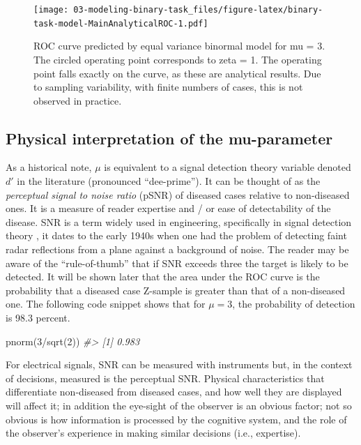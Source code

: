 \documentclass[
]{book}
\newenvironment{Shaded}{\begin{snugshade}}{\end{snugshade}}
\newcommand{\CommentTok}[1]{\textcolor[rgb]{0.56,0.35,0.01}{\textit{#1}}}
\newcommand{\DecValTok}[1]{\textcolor[rgb]{0.00,0.00,0.81}{#1}}
\newcommand{\FunctionTok}[1]{\textcolor[rgb]{0.00,0.00,0.00}{#1}}
\newcommand{\NormalTok}[1]{#1}
\newcommand{\SpecialCharTok}[1]{\textcolor[rgb]{0.00,0.00,0.00}{#1}}
\begin{document}
\begin{figure}
\centering
\texttt{[image: 03-modeling-binary-task\_files/figure-latex/binary-task-model-MainAnalyticalROC-1.pdf]}
\caption{\label{fig:binary-task-model-MainAnalyticalROC}ROC curve predicted by equal variance binormal model for mu = 3. The circled operating point corresponds to zeta = 1. The operating point falls exactly on the curve, as these are analytical results. Due to sampling variability, with finite numbers of cases, this is not observed in practice.}
\end{figure}

\hypertarget{binary-task-model-mu-parameter-intepretation}{%
\subsection{Physical interpretation of the mu-parameter}\label{binary-task-model-mu-parameter-intepretation}}

As a historical note, \(\mu\) is equivalent \citep{macmillan2004detection} to a signal detection theory variable denoted \(d'\) in the literature (pronounced ``dee-prime''). It can be thought of as the \emph{perceptual signal to noise ratio} (pSNR) of diseased cases relative to non-diseased ones. It is a measure of reader expertise and / or ease of detectability of the disease. SNR is a term widely used in engineering, specifically in signal detection theory \citep{green1966signal, egan1975book}, it dates to the early 1940s when one had the problem \citep[\citet{marcum1960statistical}]{marcum1947statistical} of detecting faint radar reflections from a plane against a background of noise. The reader may be aware of the ``rule-of-thumb'' that if SNR exceeds three the target is likely to be detected. It will be shown later that the area under the ROC curve is the probability that a diseased case Z-sample is greater than that of a non-diseased one. The following code snippet shows that for \(\mu = 3\), the probability of detection is 98.3 percent.

\begin{Shaded}
\begin{Highlighting}[]
\FunctionTok{pnorm}\NormalTok{(}\DecValTok{3}\SpecialCharTok{/}\FunctionTok{sqrt}\NormalTok{(}\DecValTok{2}\NormalTok{))}
\CommentTok{\#\textgreater{} [1] 0.983}
\end{Highlighting}
\end{Shaded}

For electrical signals, SNR can be measured with instruments but, in the context of decisions, measured is the perceptual SNR. Physical characteristics that differentiate non-diseased from diseased cases, and how well they are displayed will affect it; in addition the eye-sight of the observer is an obvious factor; not so obvious is how information is processed by the cognitive system, and the role of the observer's experience in making similar decisions (i.e., expertise).
\end{document}
